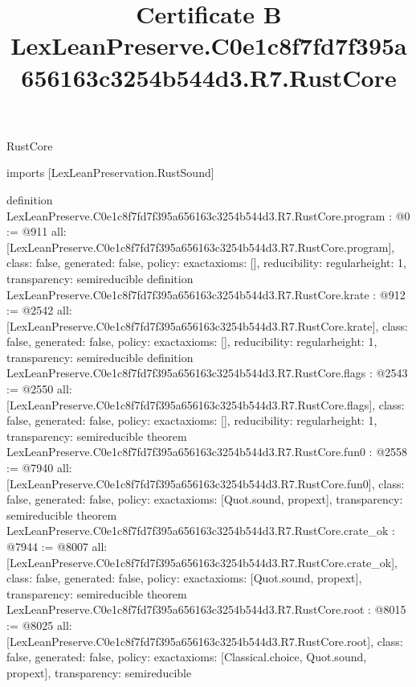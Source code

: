 \begin{lexlean}{RustCore}
\title{Certificate B LexLeanPreserve.C0e1c8f7fd7f395a656163c3254b544d3.R7.RustCore}
\begin{coremodule}
imports [LexLeanPreservation.RustSound]

definition LexLeanPreserve.C0e1c8f7fd7f395a656163c3254b544d3.R7.RustCore.program : @0 := @911 {
  all: [LexLeanPreserve.C0e1c8f7fd7f395a656163c3254b544d3.R7.RustCore.program],
  class: false,
  generated: false,
  policy: exact{axioms: []},
  reducibility: regular{height: 1},
  transparency: semireducible
}
definition LexLeanPreserve.C0e1c8f7fd7f395a656163c3254b544d3.R7.RustCore.krate : @912 := @2542 {
  all: [LexLeanPreserve.C0e1c8f7fd7f395a656163c3254b544d3.R7.RustCore.krate],
  class: false,
  generated: false,
  policy: exact{axioms: []},
  reducibility: regular{height: 1},
  transparency: semireducible
}
definition LexLeanPreserve.C0e1c8f7fd7f395a656163c3254b544d3.R7.RustCore.flags : @2543 := @2550 {
  all: [LexLeanPreserve.C0e1c8f7fd7f395a656163c3254b544d3.R7.RustCore.flags],
  class: false,
  generated: false,
  policy: exact{axioms: []},
  reducibility: regular{height: 1},
  transparency: semireducible
}
theorem LexLeanPreserve.C0e1c8f7fd7f395a656163c3254b544d3.R7.RustCore.fun0 : @2558 := @7940 {
  all: [LexLeanPreserve.C0e1c8f7fd7f395a656163c3254b544d3.R7.RustCore.fun0],
  class: false,
  generated: false,
  policy: exact{axioms: [Quot.sound, propext]},
  transparency: semireducible
}
theorem LexLeanPreserve.C0e1c8f7fd7f395a656163c3254b544d3.R7.RustCore.crate_ok : @7944 := @8007 {
  all: [LexLeanPreserve.C0e1c8f7fd7f395a656163c3254b544d3.R7.RustCore.crate_ok],
  class: false,
  generated: false,
  policy: exact{axioms: [Quot.sound, propext]},
  transparency: semireducible
}
theorem LexLeanPreserve.C0e1c8f7fd7f395a656163c3254b544d3.R7.RustCore.root : @8015 := @8025 {
  all: [LexLeanPreserve.C0e1c8f7fd7f395a656163c3254b544d3.R7.RustCore.root],
  class: false,
  generated: false,
  policy: exact{axioms: [Classical.choice, Quot.sound, propext]},
  transparency: semireducible
}


\end{coremodule}
\end{lexlean}
